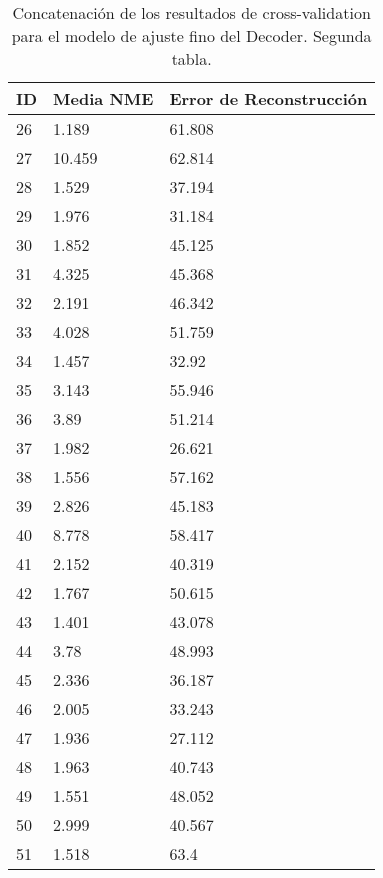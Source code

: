 \begin{table}[!ht]
    \centering
    \caption{Concatenación de los resultados de cross-validation para el modelo de ajuste fino del Decoder. Segunda tabla.}
    \begin{tabular}{|l|l|l|}
    \hline
    \cellcolor{gray!25}\textbf{ID} & \cellcolor{gray!25}\textbf{Media NME} & \cellcolor{gray!25}\textbf{Error de Reconstrucción} \\ \hline
        26 & 1.189 & 61.808 \\ \hline
        27 & 10.459 & 62.814 \\ \hline
        28 & 1.529 & 37.194 \\ \hline
        29 & 1.976 & 31.184 \\ \hline
        30 & 1.852 & 45.125 \\ \hline
        31 & 4.325 & 45.368 \\ \hline
        32 & 2.191 & 46.342 \\ \hline
        33 & 4.028 & 51.759 \\ \hline
        34 & 1.457 & 32.92 \\ \hline
        35 & 3.143 & 55.946 \\ \hline
        36 & 3.89 & 51.214 \\ \hline
        37 & 1.982 & 26.621 \\ \hline
        38 & 1.556 & 57.162 \\ \hline
        39 & 2.826 & 45.183 \\ \hline
        40 & 8.778 & 58.417 \\ \hline
        41 & 2.152 & 40.319 \\ \hline
        42 & 1.767 & 50.615 \\ \hline
        43 & 1.401 & 43.078 \\ \hline
        44 & 3.78 & 48.993 \\ \hline
        45 & 2.336 & 36.187 \\ \hline
        46 & 2.005 & 33.243 \\ \hline
        47 & 1.936 & 27.112 \\ \hline
        48 & 1.963 & 40.743 \\ \hline
        49 & 1.551 & 48.052 \\ \hline
        50 & 2.999 & 40.567 \\ \hline
        51 & 1.518 & 63.4 \\ \hline
    \end{tabular}
\end{table}

